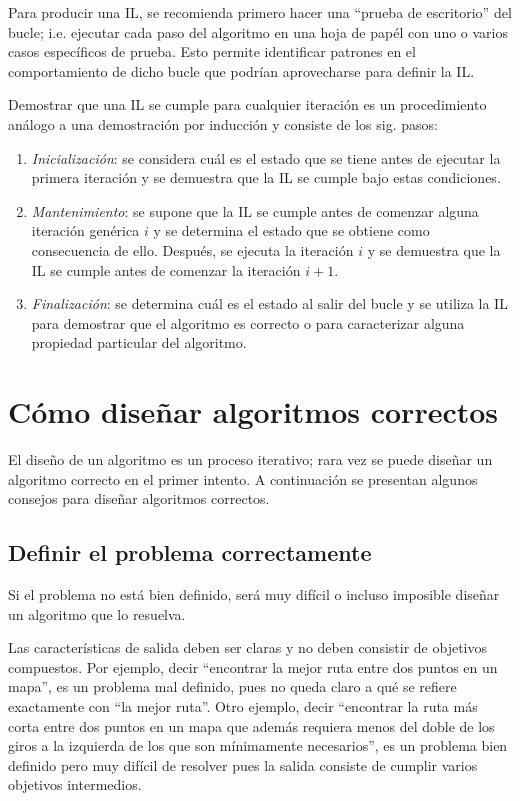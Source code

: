 Para producir una IL, se recomienda primero hacer
una ``prueba de escritorio'' del bucle; i.e. ejecutar cada paso
del algoritmo en una hoja de papél con uno o varios casos específicos
de prueba. Esto permite identificar patrones en el comportamiento
de dicho bucle que podrían aprovecharse para definir la IL. 

Demostrar que una IL se cumple para cualquier iteración
es un procedimiento análogo a una demostración por inducción y consiste
de los sig. pasos: 

\begin{enumerate}
    \item \emph{Inicialización}: se considera cuál es el estado que se tiene
    antes de ejecutar la primera iteración y se demuestra que la IL se cumple bajo estas condiciones.
    \item \emph{Mantenimiento}: se supone que la IL se cumple
    antes de comenzar alguna iteración genérica $i$ y se determina el
    estado que se obtiene como consecuencia de ello. Después, se ejecuta
    la iteración $i$ y se demuestra que la IL se cumple antes
    de comenzar la iteración $i+1$.
    \item \emph{Finalización}: se determina cuál es el estado al salir del bucle
    y se utiliza la IL para demostrar que el algoritmo
    es correcto o para caracterizar alguna propiedad particular del algoritmo. 
\end{enumerate}

\section{Cómo diseñar algoritmos correctos}

El diseño de un algoritmo es un proceso iterativo; rara vez se puede
diseñar un algoritmo correcto en el primer intento. A continuación
se presentan algunos consejos para diseñar algoritmos correctos. 

\subsection{Definir el problema correctamente}

Si el problema no está bien definido, será muy difícil o incluso imposible
diseñar un algoritmo que lo resuelva. 

Las características de salida
deben ser claras y no deben consistir de objetivos compuestos. Por
ejemplo, decir ``encontrar la mejor ruta entre dos puntos en un mapa'',
es un problema mal definido, pues no queda claro a qué se refiere
exactamente con ``la mejor ruta''. Otro ejemplo, decir ``encontrar
la ruta más corta entre dos puntos en un mapa que además requiera
menos del doble de los giros a la izquierda de los que son mínimamente
necesarios'', es un problema bien definido pero muy difícil de resolver
pues la salida consiste de cumplir varios objetivos intermedios. 

